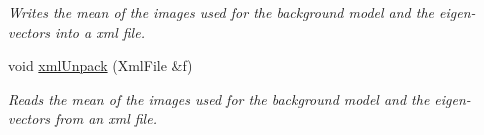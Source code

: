 \begin{DoxyCompactItemize}
\begin{DoxyCompactList}\small\item\em Writes the mean of the images used for the background model and the eigen-\/vectors into a xml file. \item\end{DoxyCompactList}\item 
\hypertarget{classBackground_a24b0703d4eb9b6bdc1d87c8e67e000ea}{
void \hyperlink{classBackground_a24b0703d4eb9b6bdc1d87c8e67e000ea}{xmlUnpack} (XmlFile \&f)}
\label{classBackground_a24b0703d4eb9b6bdc1d87c8e67e000ea}

\begin{DoxyCompactList}\small\item\em Reads the mean of the images used for the background model and the eigen-\/ vectors from an xml file. \item\end{DoxyCompactList}\end{DoxyCompactItemize}
